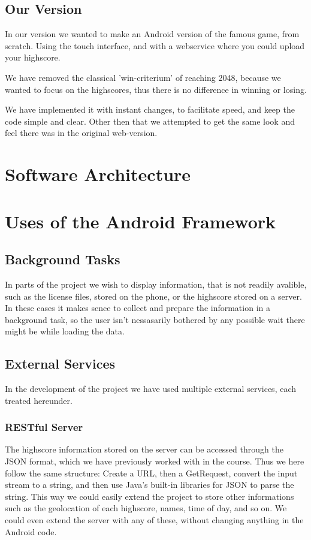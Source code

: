 \documentclass[a4paper, 12pt]{article}
\begin{document}
\subsection{Our Version}
In our version we wanted to make an Android version of the famous game, from scratch. Using the touch interface, and with a webservice where you could upload your highscore.

We have removed the classical 'win-criterium' of reaching 2048, because we wanted to focus on the highscores, thus there is no difference in winning or losing.

We have implemented it with instant changes, to facilitate speed, and keep the code simple and clear. Other then that we attempted to get the same look and feel there was in the original web-version.

\section{Software Architecture}

\section{Uses of the Android Framework}
\subsection{Background Tasks}
In parts of the project we wish to display information, that is not readily avalible, such as the license files, stored on the phone, or the highscore stored on a server. In these cases it makes sence to collect and prepare the information in a background task, so the user isn't nessasarily bothered by any possible wait there might be while loading the data.

\subsection{External Services}
In the development of the project we have used multiple external services, each treated hereunder.

\subsubsection{RESTful Server}
The highscore information stored on the server can be accessed through the JSON format, which we have previously worked with in the course. Thus we here follow the same structure: Create a URL, then a GetRequest, convert the input stream to a string, and then use Java's built-in libraries for JSON to parse the string. This way we could easily extend the project to store other informations such as the geolocation of each highscore, names, time of day, and so on. We could even extend the server with any of these, without changing anything in the Android code.
\end{document}
